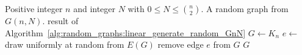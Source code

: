 
\begin{algorithmic}[1]
\Require Positive integer $n$ and integer $N$ with 
  $0 \leq N \leq \binom{n}{2}$.
\Ensure A random graph from $G(n,N)$.
  \State \Return result of Algorithm~\ref{alg:random_graphs:linear_generate_random_GnN}
\EndIf
\State $G \gets K_n$
  \State $e \gets$ draw uniformly at random from $E(G)$
  \State remove edge $e$ from $G$
\EndFor
\State \Return $G$
\end{algorithmic}
